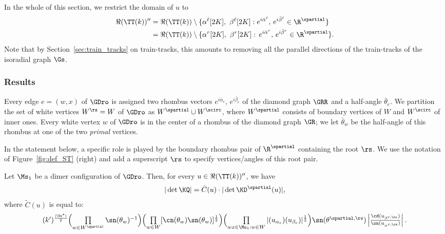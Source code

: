 \documentclass[a4paper,twoside,11pt]{article}
\begin{document}
In the whole of this section, we restrict the domain of $u$ to
\begin{align}
\Re(\TT(k))''&=\Re(\TT(k))\setminus\{\alpha^\ell[2K],\ \beta^{\ell}[2K]:e^{i\bar{\alpha}^\ell},\,e^{i\bar{\beta}^\ell}\in\R^\spartial\}
\label{equ:Re_Tk_2}\\
&=\Re(\TT(k))\setminus\{\alpha^r[2K],\ \beta^r[2K]:\,e^{i\bar{\alpha}^r},\,e^{i\bar{\beta}^r}\in\R^\spartial\}.\nonumber 
\end{align}
Note that by Section~\ref{sec:train_tracks} on train-tracks, this amounts to removing all the parallel directions of the train-tracks of the isoradial graph
$\Gs$.


\subsubsection{Results}


Every edge $e=(w,x)$ of $\GDro$ is assigned two rhombus vectors $e^{i\bar{\alpha}_e}$, $e^{i\bar{\beta}_e}$
of the diamond graph $\GRR$ and a half-angle $\bar{\theta}_e$. We partition the set of white vertices $W^\rs=W$ of $\GDro$ as $W^\spartial\cup W^\scirc$, where 
$W^\spartial$ consists of boundary vertices of $W$ and $W^\scirc$ of inner ones.
Every white vertex $w$ of $\GDro$ is in the
center of a rhombus of the diamond graph $\GR$; we let $\bar{\theta}_w$ be the half-angle of this rhombus at one of the two 
\emph{primal} vertices. 

In the statement below, a specific role is played by the boundary rhombus pair of $\R^\spartial$ containing the root $\rs$.
We use the notation
of Figure~\ref{fig:def_ST} (right) and add a superscript $\rs$ to specify vertices/angles of this root pair.

\begin{thm}\label{thm:part_function}
Let $\Ms_1$ be a dimer configuration of $\GDro$. Then, for every $u\in\Re(\TT(k))''$, we have
\begin{align*}
|\det\KQ|=\tilde{C}(u)\cdot|\det \KD^\spartial(u)|,
\end{align*}
where $\tilde{C}(u)$ is equal to:
\begin{equation*}
\textstyle
(k')^{\frac{|\Vs^*|}{2}}\Bigl(\prod\limits_{w\in W^\spartial}\sn(\theta_w)^{-1} \Bigr)
\Bigl(\prod\limits_{w\in W}[\cn(\theta_w)\sn(\theta_w)]^{\frac{1}{2}}\Bigr) 
\Bigl(\prod\limits_{wx\in\Ms_1:w\in W}|\sc(u_{\alpha_e})\sc(u_{\beta_e})|^{\frac{1}{2}}\Bigr)
\sn(\theta^{\spartial,\rs})\left|\frac{\cd(u_{\beta^{r,\rs}})}{\sn(u_{\alpha^{r,\rs}})}\right|.
\end{equation*}
\end{thm}
\end{document}
